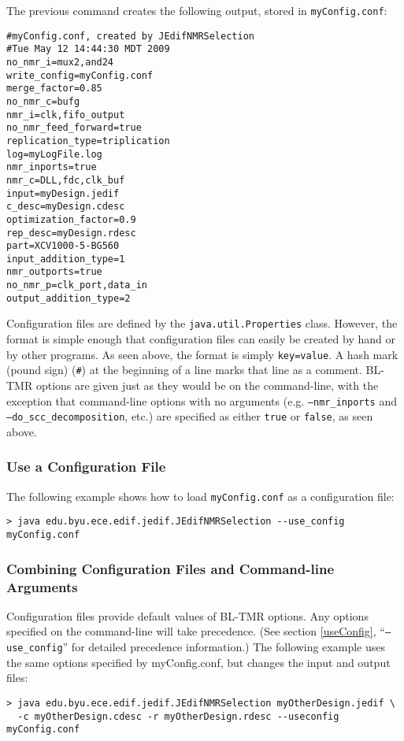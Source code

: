 The previous command creates the following output, stored in 
\texttt{myConfig.conf}:

\begin{verbatim}
#myConfig.conf, created by JEdifNMRSelection
#Tue May 12 14:44:30 MDT 2009
no_nmr_i=mux2,and24
write_config=myConfig.conf
merge_factor=0.85
no_nmr_c=bufg
nmr_i=clk,fifo_output
no_nmr_feed_forward=true
replication_type=triplication
log=myLogFile.log
nmr_inports=true
nmr_c=DLL,fdc,clk_buf
input=myDesign.jedif
c_desc=myDesign.cdesc
optimization_factor=0.9
rep_desc=myDesign.rdesc
part=XCV1000-5-BG560
input_addition_type=1
nmr_outports=true
no_nmr_p=clk_port,data_in
output_addition_type=2
\end{verbatim}

Configuration files are defined by the \texttt{java.util.Properties} class. 
However, the format is simple enough that configuration files can easily be 
created by hand or by other programs. As seen above, the format is simply 
\texttt{key=value}. A hash mark (pound sign) (\texttt{\#}) at the beginning of 
a line marks that line as a comment. BL-TMR options are given just as they would 
be on the command-line, with the exception that command-line options with no 
arguments (e.g. \texttt{--nmr\_inports} and \texttt{--do\_scc\_decomposition},
etc.) are specified as either \texttt{true} or \texttt{false}, as seen above.

\subsubsection{Use a Configuration File}

The following example shows how to load \texttt{myConfig.conf} as a configuration
file:

\begin{verbatim}
> java edu.byu.ece.edif.jedif.JEdifNMRSelection --use_config myConfig.conf
\end{verbatim}

\subsubsection{Combining Configuration Files and Command-line Arguments}
Configuration files provide default values of BL-TMR options. Any options 
specified on the command-line will take precedence. (See section 
\ref{useConfig}, ``\texttt{--use\_config}'' for detailed precedence
information.) The following example uses the same options specified by
myConfig.conf, but changes the input and output files:

\begin{verbatim}
> java edu.byu.ece.edif.jedif.JEdifNMRSelection myOtherDesign.jedif \
  -c myOtherDesign.cdesc -r myOtherDesign.rdesc --useconfig myConfig.conf
\end{verbatim}

